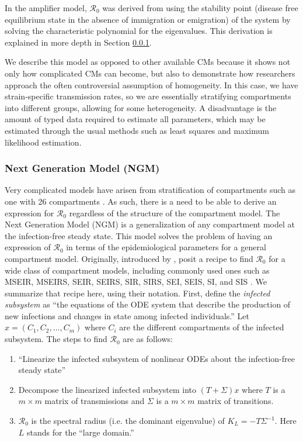 \documentclass[12pt]{article}
\newcommand{\rr}{\ensuremath{\mathcal{R}_0}}
\begin{document}
In the amplifier model, $\rr$ was derived from using the stability point (disease free equilibrium state in the absence of immigration or emigration) of the system by solving the characteristic polynomial for the eigenvalues.  This derivation is explained in more depth in Section \ref{sec:ngm}.

We describe this model as opposed to other available CMs because it shows not only how complicated CMs can become, but also to demonstrate how researchers approach the often controversial assumption of homogeneity.  In this case, we have strain-specific transmission rates, so we are essentially stratifying compartments into different groups, allowing for some heterogeneity.  A disadvantage is the amount of typed data required to estimate all parameters, which may be estimated through the usual methods such as least squares and maximum likelihood estimation.


\subsubsection{Next Generation Model (NGM)}
\label{sec:ngm}

Very complicated models have arisen from stratification of compartments such as one with 26 compartments \citep{pandey2014}.  As such, there is a need to be able to derive an expression for $\rr$ regardless of the structure of the compartment model.   The Next Generation Model (NGM) is a generalization of any compartment model at the infection-free steady state. This model solves the problem of having an expression of $\rr$ in terms of the epidemiological parameters for a general compartment model.  Originally, introduced by \citep{diekmann1990}, \cite{diekmann2009} posit a recipe to find $\rr$ for a wide class of compartment models, including commonly used ones such as MSEIR, MSEIRS, SEIR, SEIRS, SIR, SIRS, SEI, SEIS, SI, and SIS \citep{hethcote2000}. We summarize that recipe here, using their notation.  First, define the \textit{infected subsystem} as ``the equations of the ODE system that describe the production of new infections and changes in state among infected individuals.''  Let $x = (C_1, C_2, \dots, C_m)$ where $C_i$ are the different compartments of the infected subsystem.  The steps to find $\rr$ are as follows:


\begin{enumerate}
\item ``Linearize the infected subsystem of nonlinear ODEs about the infection-free steady state''
\item Decompose the linearized infected subsystem into $(T + \Sigma )x$ where $T$ is a $m\times m$ matrix of transmissions and $\Sigma$ is a $m \times m$ matrix of transitions.
\item $\rr$ is the spectral radius (i.e. the dominant eigenvalue) of $K_L=-T \Sigma^{-1}$.  Here $L$ stands for the ``large domain.''
\end{enumerate}
\end{document}
